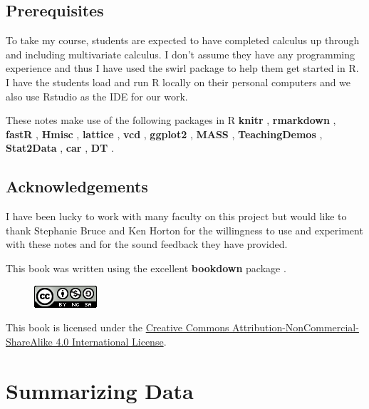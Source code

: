 \documentclass[]{book}
\theoremstyle{definition}
\theoremstyle{definition}
\theoremstyle{definition}
\theoremstyle{remark}
\begin{document}
\section{Prerequisites}\label{prerequisites}

To take my course, students are expected to have completed calculus up
through and including multivariate calculus. I don't assume they have
any programming experience and thus I have used the swirl package to
help them get started in R. I have the students load and run R locally
on their personal computers and we also use Rstudio as the IDE for our
work.

These notes make use of the following packages in R \textbf{knitr}
\citep{R-knitr}, \textbf{rmarkdown} \citep{R-rmarkdown}, \textbf{fastR}
\citep{R-fastR}, \textbf{Hmisc} \citep{R-Hmisc}, \textbf{lattice}
\citep{R-lattice}, \textbf{vcd} \citep{R-vcd}, \textbf{ggplot2}
\citep{R-ggplot2}, \textbf{MASS} \citep{R-MASS}, \textbf{TeachingDemos}
\citep{R-TeachingDemos}, \textbf{Stat2Data} \citep{R-Stat2Data},
\textbf{car} \citep{R-car}, \textbf{DT} \citep{R-DT}.

\section{Acknowledgements}\label{acknowledgements}

I have been lucky to work with many faculty on this project but would
like to thank Stephanie Bruce and Ken Horton for the willingness to use
and experiment with these notes and for the sound feedback they have
provided.

This book was written using the excellent \textbf{bookdown} package
\citep{R-bookdown}.

\begin{figure}
\centering
\includegraphics{./images/by-nc-sa.png}
\caption{}
\end{figure}

This book is licensed under the
\href{http://creativecommons.org/licenses/by-nc-sa/4.0/}{Creative
Commons Attribution-NonCommercial-ShareAlike 4.0 International License}.

\chapter{Summarizing Data}\label{Chpt1}
\end{document}
